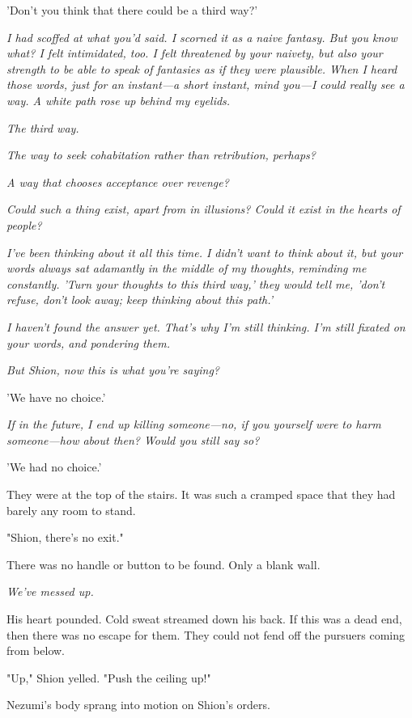 'Don't you think that there could be a third way?'

\emph{I had scoffed at what you'd said. I scorned it as a naive fantasy. But
you know what? I felt intimidated, too. I felt threatened by your
naivety, but also your strength to be able to speak of fantasies as if
they were plausible. When I heard those words, just for an instant---a
short instant, mind you---I could really see a way. A white path rose up
behind my eyelids.}

\emph{The third way.}

\emph{The way to seek cohabitation rather than retribution, perhaps?}

\emph{A way that chooses acceptance over revenge?}

\emph{Could such a thing exist, apart from in illusions? Could it exist in the
hearts of people?}

\emph{I've been thinking about it all this time. I didn't want to think about
it, but your words always sat adamantly in the middle of my thoughts,
reminding me constantly. 'Turn your thoughts to this third way,' they
would tell me, 'don't refuse, don't look away; keep thinking about this
path.'}

\emph{I haven't found the answer yet. That's why I'm still thinking. I'm still
fixated on your words, and pondering them.}

\emph{But Shion, now this is what you're saying?}

'We have no choice.'

\emph{If in the future, I end up killing someone---no, if you yourself were to
harm someone---how about then? Would you still say so?}

'We had no choice.'

\mybreak

They were at the top of the stairs. It was such a cramped space that
they had barely any room to stand.

"Shion, there's no exit."

There was no handle or button to be found. Only a blank wall.

\emph{We've messed up.}

His heart pounded. Cold sweat streamed down his back. If this was a dead
end, then there was no escape for them. They could not fend off the
pursuers coming from below.

"Up," Shion yelled. "Push the ceiling up!"

Nezumi's body sprang into motion on Shion's orders.

